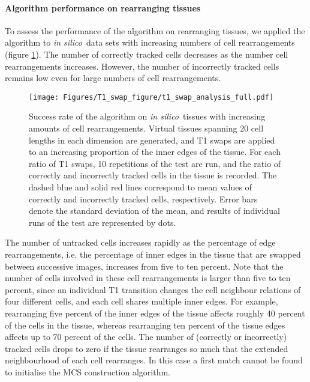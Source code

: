 \documentclass[a4paper,11pt]{article}
\newcommand{\insilico}{\textit{in silico}~}
\begin{document}
\paragraph{Algorithm performance on rearranging tissues}

To assess the performance of the algorithm on rearranging tissues, we applied the algorithm to \insilico data sets with increasing numbers of cell rearrangements (figure \ref{fig:t1_analysis}).
The number of correctly tracked cells decreases as the number cell rearrangements increases. However, the number of incorrectly tracked cells remains low even for large numbers of cell rearrangements. 

\clearpage
\begin{figure}[h]
\centering
\texttt{[image: Figures/T1\_swap\_figure/t1\_swap\_analysis\_full.pdf]}
\caption{Success rate of the algorithm on \insilico tissues with increasing amounts of cell rearrangements. 
Virtual tissues spanning 20 cell lengths in each dimension are generated, and T1 swaps are applied to an increasing proportion of the inner edges of the tissue.
For each ratio of T1 swaps, 10 repetitions of the test are run, and the ratio of correctly and incorrectly tracked cells in the tissue is recorded.
The dashed blue and solid red lines correspond to mean values of correctly and incorrectly tracked cells, respectively. Error bars denote the standard deviation of the mean, and results of individual runs of the test are represented by dots.}
\label{fig:t1_analysis}
\end{figure}




The number of untracked cells increases rapidly as the percentage of edge rearrangements, i.e. the percentage of inner edges in the tissue that are swapped between successive images, increases from five to ten percent.
Note that the number of cells involved in these cell rearrangements is larger than five to ten percent, since an individual T1 transition changes the cell neighbour relations of four different cells, and each cell shares multiple inner edges.
For example, rearranging five percent of the inner edges of the tissue affects roughly 40 percent of the cells in the tissue, whereas rearranging ten percent of the tissue edges affects up to 70 percent of the cells. 
The number of (correctly or incorrectly) tracked cells drops to zero if the tissue rearranges so much that the extended neighbourhood of each cell rearranges. In this case a first match cannot be found to initialise the MCS construction algorithm.
\end{document}
